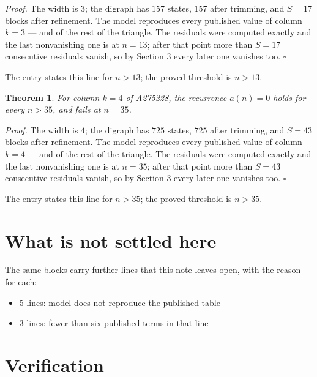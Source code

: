 \documentclass[11pt]{article}
\newtheorem{theorem}{Theorem}
\theoremstyle{definition}
\begin{document}
{\itshape Proof.} The width is $3$; the digraph has $157$ states, $157$ after trimming, and $S = 17$ blocks after refinement. The model reproduces every published value of column $k = 3$ --- and of the rest of the triangle. The residuals were computed exactly and the last nonvanishing one is at $n = 13$; after that point more than $S = 17$ consecutive residuals vanish, so by Section 3 every later one vanishes too. $\square$

The entry states this line for $n > 13$; the proved threshold is $n > 13$.

\begin{theorem} For column $k = 4$ of A275228, the recurrence $a(n) = 0$ holds for every $n > 35$, and fails at $n = 35$.\end{theorem}

{\itshape Proof.} The width is $4$; the digraph has $725$ states, $725$ after trimming, and $S = 43$ blocks after refinement. The model reproduces every published value of column $k = 4$ --- and of the rest of the triangle. The residuals were computed exactly and the last nonvanishing one is at $n = 35$; after that point more than $S = 43$ consecutive residuals vanish, so by Section 3 every later one vanishes too. $\square$

The entry states this line for $n > 35$; the proved threshold is $n > 35$.

\section{What is not settled here}

The same blocks carry further lines that this note leaves open, with the reason for each:

\begin{itemize}

\item 5 lines: model does not reproduce the published table

\item 3 lines: fewer than six published terms in that line

\end{itemize}

\section{Verification}
\end{document}

